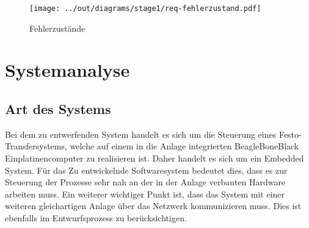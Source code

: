 
























\begin{figure}
    \centering
    \texttt{[image: ../out/diagrams/stage1/req-fehlerzustand.pdf]}
    \caption{Fehlerzustände}
    \label{fig:stm_fehler}
\end{figure}


\section{Systemanalyse}\label{sec:systemanalyse}


\subsection{Art des Systems}

Bei dem zu entwerfenden System handelt es sich um die Steuerung eines Festo-Transfersystems, welche auf einem in die Anlage integrierten BeagleBoneBlack Einplatinencomputer zu realisieren ist.
Daher handelt es sich um ein Embedded System. 
Für das Zu entwickelnde Softwaresystem bedeutet dies, dass es zur Steuerung der Prozesse sehr nah an der in der Anlage verbauten Hardware arbeiten muss. 
Ein weiterer wichtiger Punkt ist, dass das System mit einer weiteren gleichartigen Anlage über das Netzwerk kommunizieren muss. Dies ist ebenfalls im Entwurfsprozess zu berücksichtigen.

